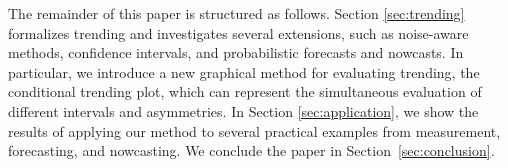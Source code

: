 The remainder of this paper is structured as follows. 
Section \ref{sec:trending} formalizes trending and investigates several extensions, such as noise-aware methods, confidence intervals, and probabilistic forecasts and nowcasts. 
In particular, we introduce a new graphical method for evaluating trending, the conditional trending plot, which can represent the simultaneous evaluation of different intervals and asymmetries. 
In Section \ref{sec:application}, we show the results of applying our method to several practical examples from measurement, forecasting, and nowcasting. 
We conclude the paper in Section~\ref{sec:conclusion}.
